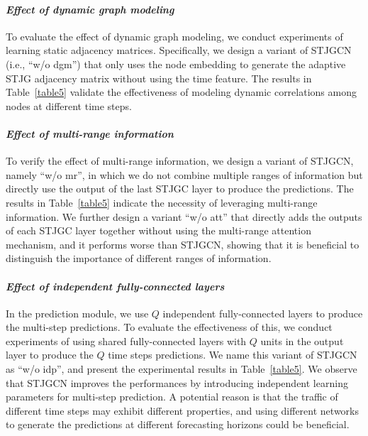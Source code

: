\documentclass[10pt,journal,compsoc]{IEEEtran}
\begin{document}
\paragraph{\textit{Effect of dynamic graph modeling}} 

To evaluate the effect of dynamic graph modeling, we conduct experiments of learning static adjacency matrices. Specifically, we design a variant of STJGCN (i.e., ``w/o dgm'') that only uses the node embedding to generate the adaptive STJG adjacency matrix without using the time feature. The results in Table~\ref{table5} validate the effectiveness of modeling dynamic correlations among nodes at different time steps. 

\paragraph{\textit{Effect of multi-range information}} 

To verify the effect of multi-range information, we design a variant of STJGCN, namely ``w/o mr'', in which we do not combine multiple ranges of information but directly use the output of the last STJGC layer to produce the predictions. The results in Table~\ref{table5} indicate the necessity of leveraging multi-range information. We further design a variant ``w/o att'' that directly adds the outputs of each STJGC layer together without using the multi-range attention mechanism, and it performs worse than STJGCN, showing that it is beneficial to distinguish the importance of different ranges of information.  

\paragraph{\textit{Effect of independent fully-connected layers}} 

In the prediction module, we use $ Q $ independent fully-connected layers to produce the multi-step predictions. To evaluate the effectiveness of this, we conduct experiments of using shared fully-connected layers with $ Q $ units in the output layer to produce the $ Q $ time steps predictions. We name this variant of STJGCN as ``w/o idp'', and present the experimental results in Table~\ref{table5}.  We observe that STJGCN improves the performances by introducing independent learning parameters for multi-step prediction. A potential reason is that the traffic of different time steps may exhibit different properties, and using different networks to generate the predictions at different forecasting horizons could be beneficial. 
\end{document}
